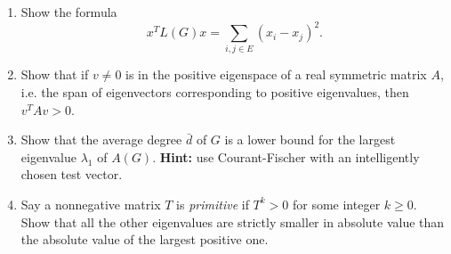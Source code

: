 \documentclass[11pt, oneside]{article}   	%
\begin{document}
\begin{enumerate}
\item Show the formula 
$$ x^T L(G) x = \sum_{i,j \in E} (x_i - x_j)^2.$$
\item Show that if $v \neq 0$ is in the positive eigenspace of a real symmetric matrix $A$, i.e. the span of eigenvectors corresponding to positive eigenvalues, then $v^T A v > 0$. 
\item Show that the average degree $\bar{d}$ of $G$ is a lower bound for the largest eigenvalue $\lambda_1$ of $A(G)$. \textbf{Hint:} use Courant-Fischer with an intelligently chosen test vector.
\item Say a nonnegative matrix $T$ is \emph{primitive} if $T^k > 0$ for some integer $k \geq 0$. Show that all the other eigenvalues are strictly smaller in absolute value than the absolute value of the largest positive one.\end{enumerate}
\item 
\end{document}
